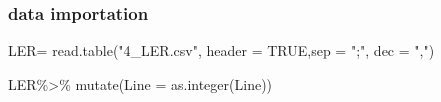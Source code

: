 \documentclass[
]{article}
\newenvironment{Shaded}{\begin{snugshade}}{\end{snugshade}}
\newcommand{\AttributeTok}[1]{\textcolor[rgb]{0.77,0.63,0.00}{#1}}
\newcommand{\ConstantTok}[1]{\textcolor[rgb]{0.00,0.00,0.00}{#1}}
\newcommand{\FunctionTok}[1]{\textcolor[rgb]{0.00,0.00,0.00}{#1}}
\newcommand{\NormalTok}[1]{#1}
\newcommand{\OtherTok}[1]{\textcolor[rgb]{0.56,0.35,0.01}{#1}}
\newcommand{\SpecialCharTok}[1]{\textcolor[rgb]{0.00,0.00,0.00}{#1}}
\newcommand{\StringTok}[1]{\textcolor[rgb]{0.31,0.60,0.02}{#1}}
\begin{document}
\hypertarget{data-importation}{%
\subsubsection{data importation}\label{data-importation}}

\begin{Shaded}
\begin{Highlighting}[]
\NormalTok{LER}\OtherTok{=} \FunctionTok{read.table}\NormalTok{(}\StringTok{"4\_LER.csv"}\NormalTok{, }\AttributeTok{header =} \ConstantTok{TRUE}\NormalTok{,}\AttributeTok{sep =} \StringTok{";"}\NormalTok{, }\AttributeTok{dec =} \StringTok{","}\NormalTok{)}

\NormalTok{LER}\SpecialCharTok{\%\textgreater{}\%}
  \FunctionTok{mutate}\NormalTok{(}\AttributeTok{Line =} \FunctionTok{as.integer}\NormalTok{(Line))}
\end{Highlighting}
\end{Shaded}
\end{document}
